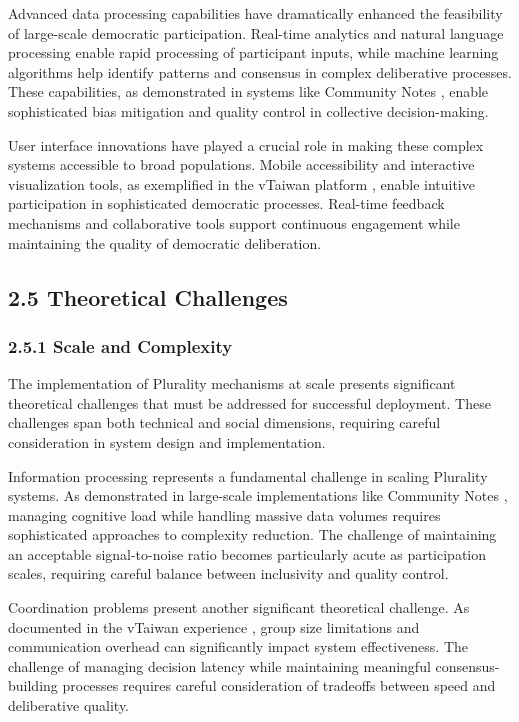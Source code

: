 Advanced data processing capabilities have dramatically enhanced the feasibility of large-scale democratic participation. Real-time analytics and natural language processing enable rapid processing of participant inputs, while machine learning algorithms help identify patterns and consensus in complex deliberative processes. These capabilities, as demonstrated in systems like Community Notes \citep{communitynotes2024}, enable sophisticated bias mitigation and quality control in collective decision-making.

User interface innovations have played a crucial role in making these complex systems accessible to broad populations. Mobile accessibility and interactive visualization tools, as exemplified in the vTaiwan platform \citep{vtaiwan2023}, enable intuitive participation in sophisticated democratic processes. Real-time feedback mechanisms and collaborative tools support continuous engagement while maintaining the quality of democratic deliberation.

\hypertarget{theoretical-challenges}{%
\subsection{2.5 Theoretical Challenges}\label{theoretical-challenges}}

\hypertarget{scale-and-complexity}{%
\subsubsection{2.5.1 Scale and Complexity}\label{scale-and-complexity}}

The implementation of Plurality mechanisms at scale presents significant theoretical challenges that must be addressed for successful deployment. These challenges span both technical and social dimensions, requiring careful consideration in system design and implementation.

Information processing represents a fundamental challenge in scaling Plurality systems. As demonstrated in large-scale implementations like Community Notes \citep{communitynotes2024}, managing cognitive load while handling massive data volumes requires sophisticated approaches to complexity reduction. The challenge of maintaining an acceptable signal-to-noise ratio becomes particularly acute as participation scales, requiring careful balance between inclusivity and quality control.

Coordination problems present another significant theoretical challenge. As documented in the vTaiwan experience \citep{vtaiwan2023}, group size limitations and communication overhead can significantly impact system effectiveness. The challenge of managing decision latency while maintaining meaningful consensus-building processes requires careful consideration of tradeoffs between speed and deliberative quality.

